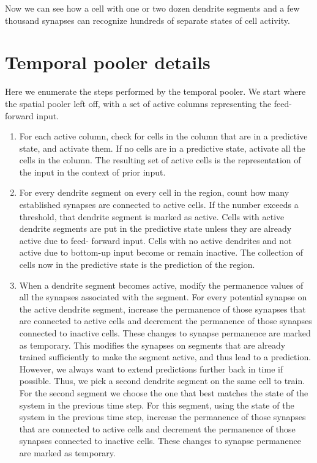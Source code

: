 \documentclass{report}
\begin{document}
Now we can see how a cell with one or two dozen dendrite segments and
a few thousand synapses can recognize hundreds of separate states of
cell activity.

\section*{Temporal pooler details}

Here we enumerate the steps performed by the temporal pooler. We start
where the spatial pooler left off, with a set of active columns
representing the feed-forward input.

\begin{enumerate}
\item For each active column, check for cells in the column that are
  in a predictive state, and activate them. If no cells are in a
  predictive state, activate all the cells in the column. The
  resulting set of active cells is the representation of the input in
  the context of prior input.

\item For every dendrite segment on every cell in the region, count
  how many established synapses are connected to active cells. If the
  number exceeds a threshold, that dendrite segment is marked as
  active. Cells with active dendrite segments are put in the
  predictive state unless they are already active due to feed- forward
  input. Cells with no active dendrites and not active due to
  bottom-up input become or remain inactive. The collection of cells
  now in the predictive state is the prediction of the region.

\item When a dendrite segment becomes active, modify the permanence
  values of all the synapses associated with the segment. For every
  potential synapse on the active dendrite segment, increase the
  permanence of those synapses that are connected to active cells and
  decrement the permanence of those synapses connected to inactive
  cells. These changes to synapse permanence are marked as temporary.
  This modifies the synapses on segments that are already trained
  sufficiently to make the segment active, and thus lead to a
  prediction. However, we always want to extend predictions further
  back in time if possible. Thus, we pick a second dendrite segment on
  the same cell to train. For the second segment we choose the one
  that best matches the state of the system in the previous time
  step. For this segment, using the state of the system in the
  previous time step, increase the permanence of those synapses that
  are connected to active cells and decrement the permanence of those
  synapses connected to inactive cells. These changes to synapse
  permanence are marked as temporary.


\end{enumerate}
\end{document}
